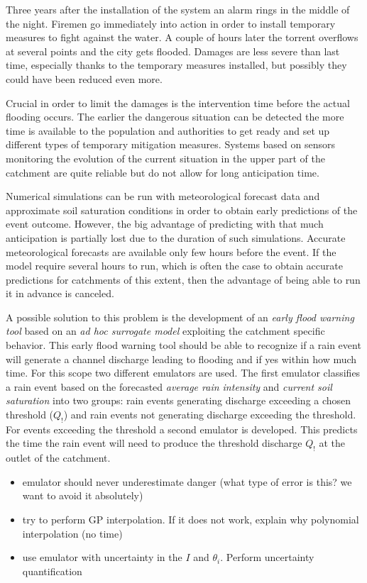 Three years after the installation of the system an alarm rings in the middle of the night.
Firemen go immediately into action in order to install temporary measures to fight against the water.
A couple of hours later the torrent overflows at several points and the city gets flooded.
Damages are less severe than last time, especially thanks to the temporary measures installed, but possibly they could have been reduced even more.

Crucial in order to limit the damages is the intervention time before the actual flooding occurs.
The earlier the dangerous situation can be detected the more time is available to the population and authorities to get ready and set up different types of temporary mitigation measures.
Systems based on sensors monitoring the evolution of the current situation in the upper part of the catchment are quite reliable but do not allow for long anticipation time. 

Numerical simulations can be run with meteorological forecast data and approximate soil saturation conditions in order to obtain early predictions of the event outcome.
However, the big advantage of predicting with that much anticipation is partially lost due to the duration of such simulations.
Accurate meteorological forecasts are available only few hours before the event.
If the model require several hours to run, which is often the case to obtain accurate predictions for catchments of this extent, then the advantage of being able to run it in advance is canceled.

A possible solution to this problem is the development of an \emph{early flood warning tool} based on an \emph{ad hoc surrogate model} exploiting the catchment specific behavior.
This early flood warning tool should be able to recognize if a rain event will generate a channel discharge leading to flooding and if yes within how much time.
For this scope two different emulators are used.
The first emulator classifies a rain event based on the forecasted \emph{average rain intensity} and \emph{current soil saturation} into two groups: rain events generating discharge exceeding a chosen threshold ($Q_!$) and rain events not generating discharge exceeding the threshold.
For events exceeding the threshold a second emulator is developed.
This predicts the time the rain event will need to produce the threshold discharge $Q_!$ at the outlet of the catchment.


\begin{itemize}
\itemsep0em
  \item emulator should never underestimate danger (what type of error is this? we want to avoid it absolutely)
  \item try to perform GP interpolation. If it does not work, explain why polynomial interpolation (no time)
  \item use emulator with uncertainty in the $I$ and $\theta_i$. Perform uncertainty quantification
\end{itemize}

